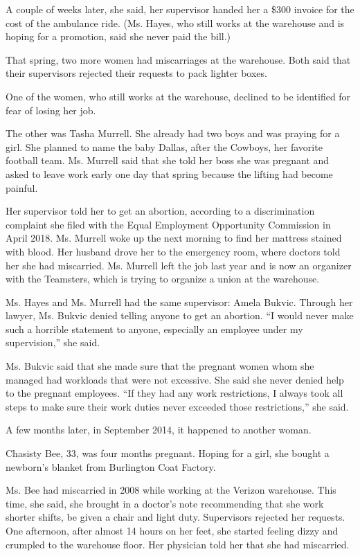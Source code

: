 A couple of weeks later, she said, her supervisor handed her a \$300
invoice for the cost of the ambulance ride. (Ms. Hayes, who still works
at the warehouse and is hoping for a promotion, said she never paid the
bill.)

That spring, two more women had miscarriages at the warehouse. Both said
that their supervisors rejected their requests to pack lighter boxes.

One of the women, who still works at the warehouse, declined to be
identified for fear of losing her job.

The other was Tasha Murrell. She already had two boys and was praying
for a girl. She planned to name the baby Dallas, after the Cowboys, her
favorite football team. Ms. Murrell said that she told her boss she was
pregnant and asked to leave work early one day that spring because the
lifting had become painful.

Her supervisor told her to get an abortion, according to a
discrimination complaint she filed with the Equal Employment Opportunity
Commission in April 2018. Ms. Murrell woke up the next morning to find
her mattress stained with blood. Her husband drove her to the emergency
room, where doctors told her she had miscarried. Ms. Murrell left the
job last year and is now an organizer with the Teamsters, which is
trying to organize a union at the warehouse.

Ms. Hayes and Ms. Murrell had the same supervisor: Amela Bukvic. Through
her lawyer, Ms. Bukvic denied telling anyone to get an abortion. ``I
would never make such a horrible statement to anyone, especially an
employee under my supervision,'' she said.

Ms. Bukvic said that she made sure that the pregnant women whom she
managed had workloads that were not excessive. She said she never denied
help to the pregnant employees. ``If they had any work restrictions, I
always took all steps to make sure their work duties never exceeded
those restrictions,'' she said.

A few months later, in September 2014, it happened to another woman.

Chasisty Bee, 33, was four months pregnant. Hoping for a girl, she
bought a newborn's blanket from Burlington Coat Factory.

Ms. Bee had miscarried in 2008 while working at the Verizon warehouse.
This time, she said, she brought in a doctor's note recommending that
she work shorter shifts, be given a chair and light duty. Supervisors
rejected her requests. One afternoon, after almost 14 hours on her feet,
she started feeling dizzy and crumpled to the warehouse floor. Her
physician told her that she had miscarried.

